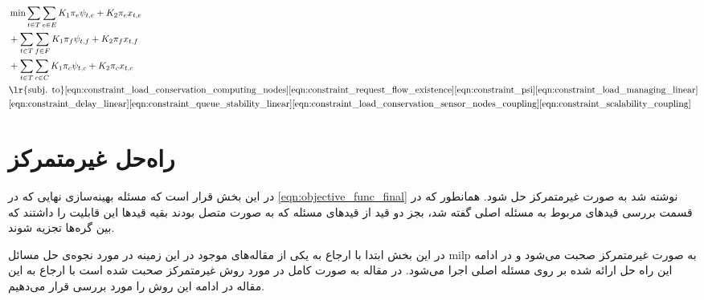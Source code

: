 	\begin{align}
		&\min \sum_{t \in T}\sum_{e \in E} K_1\pi_e\psi_{t,e}+K_2\pi_ex_{t,e}\notag \\
		&+\sum_{t \in T}\sum_{f \in F} K_1\pi_f\psi_{t,f}+K_2\pi_fx_{t,f}\notag \\
		&+\sum_{t \in T}\sum_{c \in C} K_1\pi_c\psi_{t,c}+K_2\pi_cx_{t,c} \label{eqn:objective_func_final} \notag \\
		&\text{\lr{subj. to}}
		\cref{eqn:constraint_load_conservation_computing_nodes}
		\cref{eqn:constraint_request_flow_existence}\cref{eqn:constraint_psi}
		\cref{eqn:constraint_load_managing_linear} \notag \\
		&\cref{eqn:constraint_delay_linear}
		\cref{eqn:constraint_queue_stability_linear}
		\cref{eqn:constraint_load_conservation_sensor_nodes_coupling}
		\cref{eqn:constraint_scalability_coupling}
	\end{align}
	\section{راه‌حل غیرمتمرکز}
	در این بخش قرار است که مسئله بهینه‌سازی نهایی که در \cref{eqn:objective_func_final} نوشته شد به صورت غیرمتمرکز حل شود. 
	همانطور که در قسمت بررسی قیدهای مربوط به مسئله اصلی گفته شد، بجز دو قید از قیدهای مسئله که به صورت متصل بودند بقیه قیدها این قابلیت را داشتند که بین گره‌ها تجزیه شوند. 
	
	در این بخش ابتدا با ارجاع به یکی از مقاله‌های موجود در این زمینه در مورد نجوه‌ی حل مسائل milp به صورت غیرمتمرکز صحبت می‌شود و در ادامه این راه حل ارائه شده بر روی مسئله اصلی اجرا می‌شود. 
	در مقاله \cite{decentralized_approach} به صورت کامل در مورد روش غیرمتمرکز صحبت شده است با ارجاع به این مقاله در ادامه این روش را مورد بررسی قرار می‌دهیم. 
	
